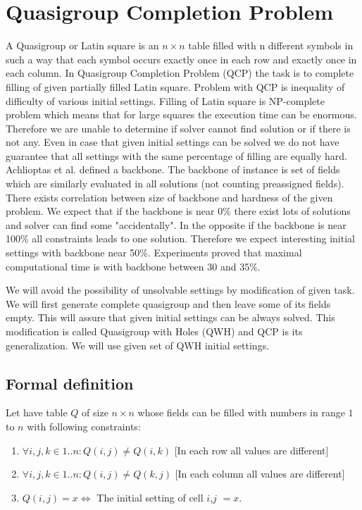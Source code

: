 \section{Quasigroup Completion Problem}
A Quasigroup or Latin square is an $n \times n$ table filled with n different symbols in such a way that each symbol occurs exactly once in each row and exactly once in each column. In Quasigroup Completion Problem (QCP) the task is to complete filling of given partially filled Latin square. Problem with QCP is inequality of difficulty of various initial settings. Filling of Latin square is NP-complete problem which means that for large squares the execution time can be enormous. Therefore we are unable to determine if solver cannot find solution or if there is not any. Even in case that given initial settings can be solved we do not have guarantee that all settings with the same percentage of filling are equally hard. Achlioptas et al. \cite{Achlioptas00generatingsatisfiable} defined a backbone. The backbone of instance is set of fields which are similarly evaluated in all solutions (not counting preassigned fields). There exists correlation between size of backbone and hardness of the given problem. We expect that if the backbone is near 0\% there exist lots of solutions and solver can find some "accidentally". In the opposite if the backbone is near 100\% all constraints leads to one solution. Therefore we expect interesting initial settings with backbone near 50\%. Experiments \cite{Achlioptas00generatingsatisfiable} proved that maximal computational time is with backbone between 30 and 35\%.

We will avoid the possibility of unsolvable settings by modification of given task. We will first generate complete quasigroup and then leave some of its fields empty. This will assure that given initial settings can be always solved. This modification is called Quasigroup with Holes (QWH) and QCP is its generalization. We will use given set of QWH initial settings.

\subsection{Formal definition}
Let have table $Q$ of size $n \times n$ whose fields can be filled with numbers in range $1$ to $n$ with following constraints:
\begin{enumerate}
	\item $\forall i,j,k \in 1..n : Q(i,j) \neq Q(i,k)$  [In each row all values are different]
	\item $\forall i,j,k \in 1..n : Q(i,j) \neq Q(k,j)$  [In each column all values are different]
	\item $Q(i,j)= x \Leftrightarrow$ The initial setting of cell $i$,$j$ $= x$.
\end{enumerate}

